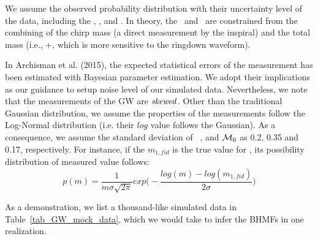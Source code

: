 \documentclass[twocolumn]{aastex62}
\begin{document}
We assume the observed probability distribution with their uncertainty level of the data, including the \mone, \mtwo, and \dl. In theory, the \mone\ and \mtwo\ are constrained from the combining of the chirp mass (a direct measurement by the inspiral) and the total mass (i.e., \mone+\mtwo, which is more sensitive to the ringdown waveform).

In Archisman et al. (2015), the expected statistical errors of the measurement has been estimated with Bayesian parameter estimation. We adopt their implications as our guidance to setup noise level of our simulated data.  Nevertheless, we note that the measurements of the GW are ${\it skewed}$. Other than the traditional Gaussian distribution, we assume the properties of the measurements follow the Log-Normal distribution (i.e. their $log$ value follows the Gaussian). As a consequence, we assume the standard deviation of \mone\ \dl, and ${\cal M}_0$ as 0.2, 0.35 and 0.17, respectively. For instance, if the $m_{1,fid}$ is the true value for \mone, its possibility distribution of measured value follows:
 \begin{equation} \label{equ_lognorm}
p(m) = \frac{1}{m\sigma\sqrt{2\pi}} exp \big(- \frac{log(m)-log(m_{1,fid})}{2\sigma} \big) 
 \end{equation}

As a demonstration, we list a thousand-like simulated data in Table~\ref{tab_GW_mock_data}, which we would take to infer the BHMFs in one realization.
\end{document}
